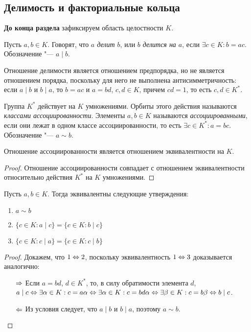 \subsection{Делимость и факториальные кольца}

\textbf{До конца раздела} зафиксируем область целостности $K$.

\begin{definition}
	Пусть $a, b \in K$. Говорят, что \textit{$a$ делит $b$}, или \textit{$b$ делится на $a$}, если $\exists c \in K: b = ac$. Обозначение "--- $a \mid b$.
\end{definition}

\begin{note}
	Отношение делимости является отношением предпорядка, но не является отношением порядка, поскольку для него не выполнена антисимметричность: если $a \mid b$ и $b \mid a$, то $b = ac$ и $a = bd$, $c, d \in K$, причем $cd = 1$, то есть $c, d \in K^*$.
\end{note}

\begin{definition}
	Группа $K^*$ действует на $K$ умножениями. Орбиты этого действия называются \textit{классами ассоциированности}. Элементы $a, b \in K$ называются \textit{ассоциированными}, если они лежат в одном классе ассоциированности, то есть $\exists c \in K^*: a = bc$. Обозначение "--- $a \sim b$.
\end{definition}

\begin{proposition}
	Отношение ассоциированности является отношением эквивалентности на $K$.
\end{proposition}

\begin{proof}
	Отношение ассоциированности совпадает с отношением эквивалентности относительно действия $K^*$ на $K$ умножениями.
\end{proof}

\begin{proposition}
	Пусть $a, b \in K$. Тогда эквивалентны следующие утверждения:
	\begin{enumerate}
		\item $a \sim b$
		\item $\{c \in K: a \mid c\} = \{c \in K: b \mid c\}$
		\item $\{c \in K: c \mid a\} = \{c \in K: c \mid b\}$
	\end{enumerate}
\end{proposition}

\begin{proof} Докажем, что $1 \Leftrightarrow 2$, поскольку эквивалентность $1 \Leftrightarrow 3$ доказывается аналогично:
	\begin{itemize}
		\item[$\Rightarrow$] Если $a = bd$, $d \in K^*$, то, в силу обратимости элемента $d$, $a \mid c \lra \exists \alpha \in K: c = a\alpha \hm\lra \exists \alpha \in K: c = bd\alpha \hm\lra \exists \beta \in K: c = b\beta \lra b \mid c$.
		\item[$\Leftarrow$] Из условия следует, что $a \mid b$ и $b \mid a$, поэтому $a \sim b$.\qedhere
	\end{itemize}
\end{proof}

